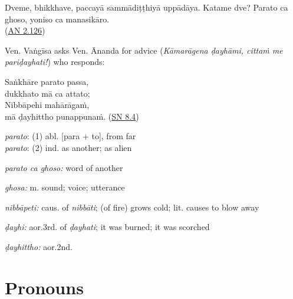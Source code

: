 \documentclass[11pt,oneside]{memoir}
\begin{document}
\begin{widecols}
Dveme, bhikkhave, paccayā sammādiṭṭhiyā uppādāya. Katame dve? Parato ca ghoso, yoniso ca manasikāro. \\[0pt]
(\href{https://suttacentral.net/an2.118-129/pli/ms}{AN 2.126})

Ven. Vaṅgīsa asks Ven. Ānanda for advice (\emph{Kāmarāgena ḍayhāmi, cittaṁ me pariḍayhati!}) who responds:

Saṅkhāre parato passa, \\[0pt]
dukkhato mā ca attato; \\[0pt]
Nibbāpehi mahārāgaṁ, \\[0pt]
mā ḍayhittho punappunaṁ. (\href{https://suttacentral.net/sn8.4/pli/ms}{SN 8.4})

\columnbreak

\emph{parato}: (1) abl. [para + to], from far \\[0pt]
\emph{parato}: (2) ind. as another; as alien

\emph{parato ca ghoso:} word of another

\emph{ghosa:} m. sound; voice; utterance

\emph{nibbāpeti:} caus. of \emph{nibbāti}; (of fire) grows cold; lit. causes to blow away

\emph{ḍayhi:} aor.3rd. of \emph{ḍayhati}; it was burned; it was scorched

\emph{ḍayhittho:} aor.2nd.
\end{widecols}

\clearpage

\section{Pronouns}
\label{sec:orgfc6a204}
\end{document}
